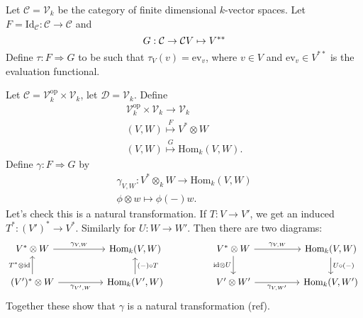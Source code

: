 \documentclass[12pt]{article}
\begin{document}
\begin{example}
	Let $\mathcal{C}=\mathcal{V}_k$ be the category of finite dimensional $k$-vector spaces. Let $F=\text{Id}_\mathcal{C}:\mathcal{C}\to\mathcal{C}$ and 
	\begin{equation*}
		G:\mathcal{C}\to\mathcal{C} \\
		V \mapsto V^{\ast\ast}
	\end{equation*}
	Define $\tau:F\Rightarrow G$ to be such that $\tau_V(v)=\text{ev}_v$, where $v\in V$ and $\text{ev}_v\in V^{\ast\ast}$ is the evaluation functional.
\end{example}

\begin{example}
	Let $\mathcal{C}=\mathcal{V}_k^{\text{op}}\times\mathcal{V}_k$, let $\mathcal{D}=\mathcal{V}_k$. Define 
	\begin{gather*}
		\mathcal{V}_k^{\text{op}}\times\mathcal{V}_k \to \mathcal{V}_k \\
		(V,W) \overset{F}{\mapsto} V^\ast\otimes W \\
		(V,W) \overset{G}{\mapsto} \text{Hom}_k(V,W).
	\end{gather*}
	Define $\gamma:F\Rightarrow G$ by 
	\begin{gather*}
		\gamma_{V,W}: V^\ast\otimes_k W \to \text{Hom}_k(V,W) \\
		\phi\otimes w \mapsto \phi(-)w.
	\end{gather*}
	Let's check this is a natural transformation. If $T:V\to V'$, we get an induced $T^\ast:(V')^\ast \to V^\ast$. Similarly for $U:W\to W'$. Then there are two diagrams: 
	\begin{equation*}
\begin{tikzcd}
V^\ast\otimes W \arrow[rr, "{\gamma_{V,W}}"]                                          &  & {\text{Hom}_k(V,W)}                           &  & V^\ast\otimes W \arrow[d, "\text{id}\otimes U"'] \arrow[rr, "{\gamma_{V,W}}"] &  & {\text{Hom}_k(V,W)} \arrow[d, "U\circ (-)"] \\
(V')^\ast\otimes W \arrow[u, "T^\ast\otimes\text{id}"] \arrow[rr, "{\gamma_{V',W}}"'] &  & {\text{Hom}_k(V',W)} \arrow[u, "(-)\circ T"'] &  & V'\otimes W' \arrow[rr, "{\gamma_{V,W'}}"']                                   &  & {\text{Hom}_k(V,W')}                       
\end{tikzcd}
	\end{equation*}
	Together these show that $\gamma$ is a natural transformation (ref).
\end{example}
\end{document}
